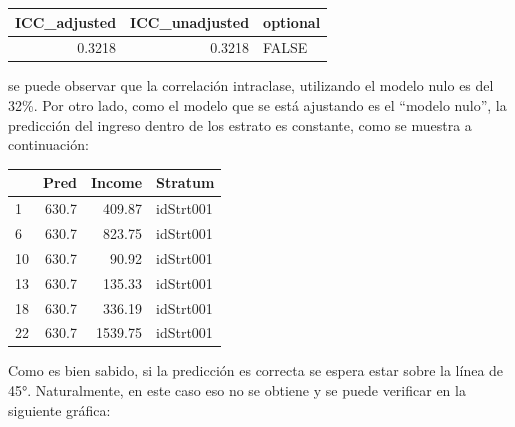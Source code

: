 \documentclass[
  12pt,
]{book}
\newenvironment{Shaded}{\begin{snugshade}}{\end{snugshade}}
\newcommand{\AttributeTok}[1]{\textcolor[rgb]{0.13,0.29,0.53}{#1}}
\newcommand{\CommentTok}[1]{\textcolor[rgb]{0.56,0.35,0.01}{\textit{#1}}}
\newcommand{\DataTypeTok}[1]{\textcolor[rgb]{0.13,0.29,0.53}{#1}}
\newcommand{\DecValTok}[1]{\textcolor[rgb]{0.00,0.00,0.81}{#1}}
\newcommand{\FunctionTok}[1]{\textcolor[rgb]{0.13,0.29,0.53}{\textbf{#1}}}
\newcommand{\NormalTok}[1]{#1}
\newcommand{\OtherTok}[1]{\textcolor[rgb]{0.56,0.35,0.01}{#1}}
\newcommand{\SpecialCharTok}[1]{\textcolor[rgb]{0.81,0.36,0.00}{\textbf{#1}}}
\begin{document}
\begin{tabular}{r|r|l}
\hline
ICC\_adjusted & ICC\_unadjusted & optional\\
\hline
0.3218 & 0.3218 & FALSE\\
\hline
\end{tabular}

se puede observar que la correlación intraclase, utilizando el modelo nulo es del 32\%. Por otro lado, como el modelo que se está ajustando es el ``modelo nulo'', la predicción del ingreso dentro de los estrato es constante, como se muestra a continuación:

\begin{Shaded}
\end{Shaded}

\begin{tabular}{l|r|r|l}
\hline
  & Pred & Income & Stratum\\
\hline
1 & 630.7 & 409.87 & idStrt001\\
\hline
6 & 630.7 & 823.75 & idStrt001\\
\hline
10 & 630.7 & 90.92 & idStrt001\\
\hline
13 & 630.7 & 135.33 & idStrt001\\
\hline
18 & 630.7 & 336.19 & idStrt001\\
\hline
22 & 630.7 & 1539.75 & idStrt001\\
\hline
\end{tabular}

Como es bien sabido, si la predicción es correcta se espera estar sobre la línea de 45°. Naturalmente, en este caso eso no se obtiene y se puede verificar en la siguiente gráfica:
\end{document}
